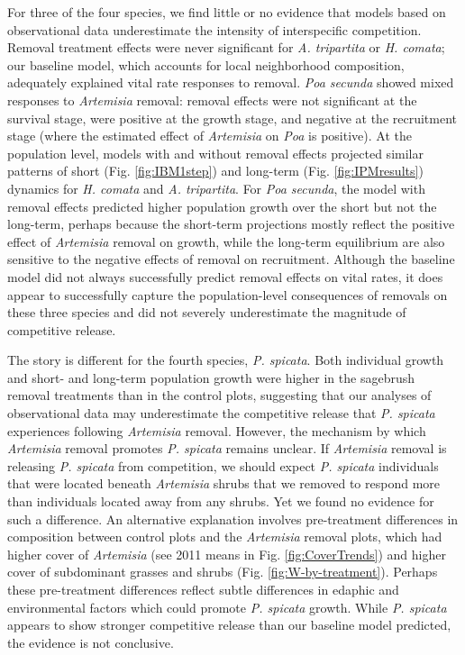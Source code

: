 \documentclass[11pt]{article}
\begin{document}
\begin{doublespacing}
For three of the four species, we find little or no evidence that models based on observational data underestimate the intensity of interspecific competition. Removal treatment effects were never significant for \textit{A. tripartita} or \textit{H. comata}; our baseline model, which accounts for local neighborhood composition, adequately explained vital rate responses to  removal.  \textit{Poa secunda} showed mixed responses to \textit{Artemisia} removal: removal effects were not significant at the survival stage, were positive at the growth stage, and negative at the recruitment stage (where the estimated effect of \textit{Artemisia} on \textit{Poa} is positive). At the population level, models with and without removal effects projected similar patterns of short (Fig. \ref{fig:IBM1step}) and long-term (Fig. \ref{fig:IPMresults}) dynamics for \textit{H. comata} and \textit{A. tripartita}. For \textit{Poa secunda}, the model with removal effects predicted higher population growth over the short but not the long-term, perhaps because the short-term projections mostly reflect the positive effect of \textit{Artemisia} removal on growth, while the long-term equilibrium are also sensitive to the negative effects of removal on recruitment. Although the baseline model did not always successfully predict removal effects on vital rates, it does appear to successfully capture the population-level consequences of removals on these three species and did not severely underestimate the magnitude of competitive release.

The story is different for the fourth species, \textit{P. spicata}. Both individual growth and short- and long-term population growth were higher in the sagebrush removal treatments than in the control plots, suggesting that our analyses of observational data may underestimate the competitive release that \textit{P. spicata} experiences following \textit{Artemisia} removal. However, the mechanism by which \textit{Artemisia} removal promotes \textit{P. spicata} remains unclear. If  \textit{Artemisia} removal is releasing \textit{P. spicata} from competition, we should expect \textit{P. spicata} individuals that were located beneath \textit{Artemisia} shrubs that we removed to respond more than individuals located away from any shrubs. Yet we found no evidence for such a difference. An alternative explanation involves pre-treatment differences in composition between control plots and  the \textit{Artemisia} removal  plots, which had higher cover of \textit{Artemisia} (see 2011 means in Fig. \ref{fig:CoverTrends}) and higher cover of subdominant grasses and shrubs (Fig. \ref{fig:W-by-treatment}). Perhaps these pre-treatment differences reflect subtle differences in edaphic and environmental factors which could promote \textit{P. spicata} growth. While \textit{P. spicata} appears to show stronger competitive release than our baseline model predicted, the evidence is not conclusive. 


\end{doublespacing}
\end{document}
